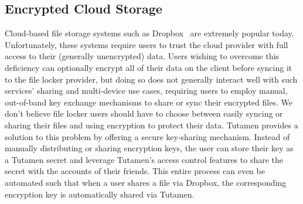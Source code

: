 \subsection{Encrypted Cloud Storage}

Cloud-based file storage systems such as Dropbox~\cite{dropbox} are
extremely popular today. Unfortunately, these systems require users to
trust the cloud provider with full access to their (generally
unencrypted) data. Users wishing to overcome this deficiency can
optionally encrypt all of their data on the client before syncing it
to the file locker provider, but doing so does not generally interact
well with such services' sharing and multi-device use cases, requiring
users to employ manual, out-of-band key exchange mechanisms to share
or sync their encrypted files. We don't believe file locker users
should have to choose between easily syncing or sharing their files
and using encryption to protect their data. Tutamen provides a
solution to this problem by offering a secure key-sharing
mechanism. Instead of manually distributing or sharing encryption
keys, the user can store their key as a Tutamen secret and leverage
Tutamen's access control features to share the secret with the
accounts of their friends. This entire process can even be automated
such that when a user shares a file via Dropbox, the corresponding
encryption key is automatically shared via Tutamen.

